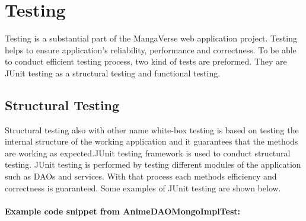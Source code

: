 \chapter{Testing}
Testing is a substantial part of the MangaVerse web application project. Testing helps to ensure application's 
reliability, performance and correctness. To be able to conduct efficient testing process, two kind of tests are preformed.
They are JUnit testing as a structural testing and functional testing.

\section{Structural Testing}
Structural testing also with other name white-box testing is based on testing the internal structure of the working application and it 
guarantees that the methods are working as expected.JUnit testing framework is used to conduct structural testing. JUnit testing is performed by testing 
different modules of the application such as DAOs and services. With that process each methods efficiency and correctness is guaranteed. 
Some examples of JUnit testing are shown below.\\ \\


\textbf{Example code snippet from AnimeDAOMongoImplTest:}

